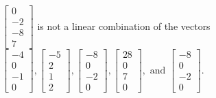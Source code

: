 \begin{exercise}
\begin{exerciseStatement}
  \end{exerciseStatement}
  \begin{exerciseAnswer}
   \(\left[\begin{array}{c}
0 \\
-2 \\
-8 \\
7
\end{array}\right]\) 
  	 is not  
	a linear combination of the vectors \(\left[\begin{array}{c}
-4 \\
0 \\
-1 \\
0
\end{array}\right] , \left[\begin{array}{c}
-5 \\
2 \\
1 \\
2
\end{array}\right] , \left[\begin{array}{c}
-8 \\
0 \\
-2 \\
0
\end{array}\right] , \left[\begin{array}{c}
28 \\
0 \\
7 \\
0
\end{array}\right] , \text{ and } \left[\begin{array}{c}
-8 \\
0 \\
-2 \\
0
\end{array}\right]\).

	
  


  \end{exerciseAnswer}
\end{exercise}